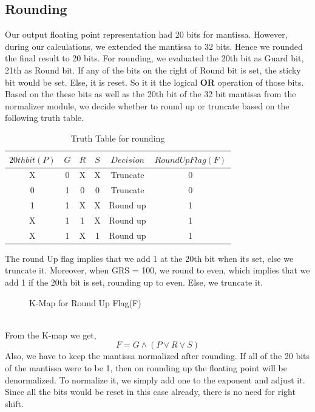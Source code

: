 \documentclass[18pt]{article}
\begin{document}
\subsection{Rounding}
\Large
Our output floating point representation had 20 bits for mantissa. However, during our calculations, we extended the mantissa to 32 bits. Hence we rounded the final result to 20 bits. For rounding, we evaluated the 20th bit as Guard bit, 21th as Round bit. If any of the bits on the right of Round bit is set, the sticky bit would be set. Else, it is reset. So it it the logical \textbf{OR} operation of those bits. Based on the these bits as well as the 20th bit of the 32 bit mantissa from the normalizer module, we decide whether to round up or truncate based on the following truth table. 
\begin{table}[!h]
    \captionsetup{font=large}
    \centering
    \begin{tabular}{||c|c|c|c|c|c||}
    \hline
     $20th bit(P)$ & $G$ & $R$ & $S$ & $Decision$ & $RoundUp Flag(F)$ \\
     \hline
        X & 0 & X & X & Truncate & 0 \\
         \hline
        0 & 1 & 0 & 0 & Truncate & 0\\
        \hline
        1 & 1 & X & X & Round up & 1\\
        \hline 
        X & 1 & 1 & X & Round up & 1\\
        \hline 
        X & 1 & X & 1 & Round up & 1\\
        \hline
     
    \hline
    \end{tabular}
    \caption{Truth Table for rounding}
\end{table}
The round Up flag implies that we add 1 at the 20th bit when its set, else we truncate it. Moreover, when GRS = 100, we round to even, which implies that we add 1 if the 20th bit is set, rounding up to even. Else, we truncate it. 
\begin{figure}[!h]
    \captionsetup{font=large}
    \caption{K-Map for Round Up Flag(F)}
\end{figure}\\
From the K-map we get, $$F = G \land (P \lor R \lor S)$$
Also, we have to keep the mantissa normalized after rounding. If all of the 20 bits of the mantissa were to be 1, then on rounding up the floating point will be denormalized. To normalize it, we simply add one to the exponent and adjust it. Since all the bits would be reset in this case already, there is no need for right shift.
\end{document}
